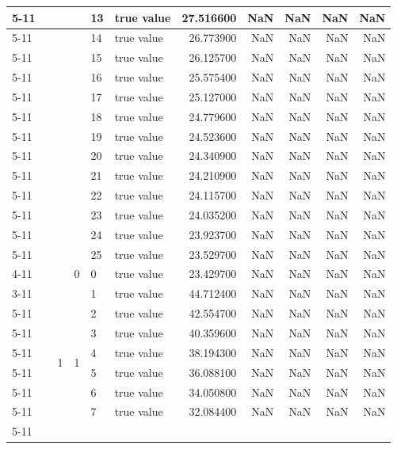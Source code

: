 \begin{tabular}{llllllrrrrr}
\cline{5-11}
 &  &  &  & 13 & true value & 27.516600 & NaN & NaN & NaN & NaN \\
\cline{5-11}
 &  &  &  & 14 & true value & 26.773900 & NaN & NaN & NaN & NaN \\
\cline{5-11}
 &  &  &  & 15 & true value & 26.125700 & NaN & NaN & NaN & NaN \\
\cline{5-11}
 &  &  &  & 16 & true value & 25.575400 & NaN & NaN & NaN & NaN \\
\cline{5-11}
 &  &  &  & 17 & true value & 25.127000 & NaN & NaN & NaN & NaN \\
\cline{5-11}
 &  &  &  & 18 & true value & 24.779600 & NaN & NaN & NaN & NaN \\
\cline{5-11}
 &  &  &  & 19 & true value & 24.523600 & NaN & NaN & NaN & NaN \\
\cline{5-11}
 &  &  &  & 20 & true value & 24.340900 & NaN & NaN & NaN & NaN \\
\cline{5-11}
 &  &  &  & 21 & true value & 24.210900 & NaN & NaN & NaN & NaN \\
\cline{5-11}
 &  &  &  & 22 & true value & 24.115700 & NaN & NaN & NaN & NaN \\
\cline{5-11}
 &  &  &  & 23 & true value & 24.035200 & NaN & NaN & NaN & NaN \\
\cline{5-11}
 &  &  &  & 24 & true value & 23.923700 & NaN & NaN & NaN & NaN \\
\cline{5-11}
 &  &  &  & 25 & true value & 23.529700 & NaN & NaN & NaN & NaN \\
\cline{4-11} \cline{5-11}
 &  &  & 0 & 0 & true value & 23.429700 & NaN & NaN & NaN & NaN \\
\cline{3-11} \cline{4-11} \cline{5-11}
 &  & \multirow[t]{101}{*}{1} & \multirow[t]{25}{*}{1} & 1 & true value & 44.712400 & NaN & NaN & NaN & NaN \\
\cline{5-11}
 &  &  &  & 2 & true value & 42.554700 & NaN & NaN & NaN & NaN \\
\cline{5-11}
 &  &  &  & 3 & true value & 40.359600 & NaN & NaN & NaN & NaN \\
\cline{5-11}
 &  &  &  & 4 & true value & 38.194300 & NaN & NaN & NaN & NaN \\
\cline{5-11}
 &  &  &  & 5 & true value & 36.088100 & NaN & NaN & NaN & NaN \\
\cline{5-11}
 &  &  &  & 6 & true value & 34.050800 & NaN & NaN & NaN & NaN \\
\cline{5-11}
 &  &  &  & 7 & true value & 32.084400 & NaN & NaN & NaN & NaN \\
\cline{5-11}

\end{tabular}
